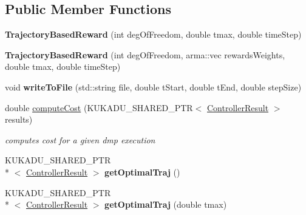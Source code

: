 \subsection*{Public Member Functions}
\begin{DoxyCompactItemize}
\item 
\hypertarget{classkukadu_1_1TrajectoryBasedReward_a646065b5b00ac72e582f9553ca790f32}{{\bfseries Trajectory\-Based\-Reward} (int deg\-Of\-Freedom, double tmax, double time\-Step)}\label{classkukadu_1_1TrajectoryBasedReward_a646065b5b00ac72e582f9553ca790f32}

\item 
\hypertarget{classkukadu_1_1TrajectoryBasedReward_a6778592c4f88c8abdc0327f12080c550}{{\bfseries Trajectory\-Based\-Reward} (int deg\-Of\-Freedom, arma\-::vec rewards\-Weights, double tmax, double time\-Step)}\label{classkukadu_1_1TrajectoryBasedReward_a6778592c4f88c8abdc0327f12080c550}

\item 
\hypertarget{classkukadu_1_1TrajectoryBasedReward_a434ee68a4e810d796789eebbd5ce17bf}{void {\bfseries write\-To\-File} (std\-::string file, double t\-Start, double t\-End, double step\-Size)}\label{classkukadu_1_1TrajectoryBasedReward_a434ee68a4e810d796789eebbd5ce17bf}

\item 
double \hyperlink{classkukadu_1_1TrajectoryBasedReward_a320c223ada03c976b2c545203d1b26d8}{compute\-Cost} (K\-U\-K\-A\-D\-U\-\_\-\-S\-H\-A\-R\-E\-D\-\_\-\-P\-T\-R$<$ \hyperlink{classkukadu_1_1ControllerResult}{Controller\-Result} $>$ results)
\begin{DoxyCompactList}\small\item\em computes cost for a given dmp execution \end{DoxyCompactList}\item 
\hypertarget{classkukadu_1_1TrajectoryBasedReward_abed1b45c79d4925e3d3ec860a1a2d736}{K\-U\-K\-A\-D\-U\-\_\-\-S\-H\-A\-R\-E\-D\-\_\-\-P\-T\-R\\*
$<$ \hyperlink{classkukadu_1_1ControllerResult}{Controller\-Result} $>$ {\bfseries get\-Optimal\-Traj} ()}\label{classkukadu_1_1TrajectoryBasedReward_abed1b45c79d4925e3d3ec860a1a2d736}

\item 
\hypertarget{classkukadu_1_1TrajectoryBasedReward_a1faa4baa7554aa2199293b97b67d715e}{K\-U\-K\-A\-D\-U\-\_\-\-S\-H\-A\-R\-E\-D\-\_\-\-P\-T\-R\\*
$<$ \hyperlink{classkukadu_1_1ControllerResult}{Controller\-Result} $>$ {\bfseries get\-Optimal\-Traj} (double tmax)}\label{classkukadu_1_1TrajectoryBasedReward_a1faa4baa7554aa2199293b97b67d715e}


\end{DoxyCompactItemize}
